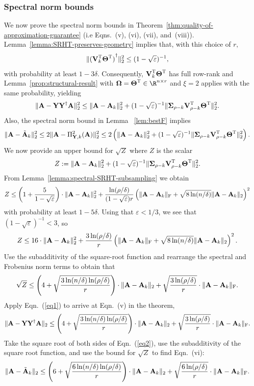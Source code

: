 \subsubsection{Spectral norm bounds}
We now prove the spectral norm bounds in Theorem~\ref{thm:quality-of-approximation-guarantee}  (i.e Eqns.~(v), (vi), (vii), and~(viii)).
Lemma~\ref{lemma:SRHT-preserves-geometry} implies that, with this choice of $r,$
$$
  \mbox{}\| {( {\bm{\mathrm{V}}}_k ^{\textsc{T}} {\bm{\mathrm{\Theta}}} ^{\textsc{T}})}^\dagger \|_2^2 \leq (1 - \sqrt{\varepsilon})^{-1},
$$
with probability at least $1 - 3\delta.$ Consequently, ${\bm{\mathrm{V}}}_k ^{\textsc{T}} {\bm{\mathrm{\Theta}}} ^{\textsc{T}}$ has full row-rank and Lemma~\ref{prop:structural-result}
 with $\matOmega = \matTh\transp \in \R^{n \times r}$ and  $\xi=2$ applies with the same probability, yielding
\begin{equation}\label{eq1}
 \TNormS{\matA - \matY \pinv{\matY} \matA } \leq \TNormS{\matA - \matA_k} + (1-\sqrt{\varepsilon})^{-1} \TNormS{\matSig_{\rho-k} \matV_{\rho-k} \transp \matTh \transp}.
\end{equation}
Also, the spectral norm bound in Lemma ~\ref{lem:bestF} implies
\begin{equation}\label{eq2}
 \TNormS{\matA - \tilde{\matA}_k } \leq 2 \TNormS{\matA - \Pi_{\matY,k}^{\mathrm{2}}(\matA) }  \leq 2 \left( \TNormS{\matA - \matA_k} + (1-\sqrt{\varepsilon})^{-1} \TNormS{\matSig_{\rho-k} \matV_{\rho-k} \transp \matTh \transp} \right).
\end{equation}
We now provide an upper bound for $\sqrt{Z}$ where $Z$ is the scalar
$$Z := \mbox{}\|{\bm{\mathrm{A}}} - {\bm{\mathrm{A}}}_k\|_2^2 + (1-\sqrt{\varepsilon})^{-1} \mbox{}\|{\bm{\mathrm{\Sigma}}}_{\rho-k} {\bm{\mathrm{V}}}_{\rho-k} ^{\textsc{T}} {\bm{\mathrm{\Theta}}} ^{\textsc{T}}\|_2^2.$$
From Lemma~\ref{lemma:spectral-SRHT-subsampling} we obtain
\[
Z \leq \left(1 + {5\over 1-\sqrt{\varepsilon}}\right) \cdot \mbox{}\|{\bm{\mathrm{A}}} - {\bm{\mathrm{A}}}_k\|_2^2 + { \ln (\rho/\delta)\over (1-\sqrt{\varepsilon}) r} \left( \mbox{}\|{\bm{\mathrm{A}}} - {\bm{\mathrm{A}}}_k\|_\mathrm{F} + \sqrt{8 \ln(n/\delta)} \mbox{}\|{\bm{\mathrm{A}}} - {\bm{\mathrm{A}}}_k\|_2 \right)^2
\]
with probability at least $1 - 5\delta.$ Using that $\varepsilon < 1/3$, we see that $(1-\sqrt{\varepsilon})^{-1} < 3$, so
\[
Z \leq 16 \cdot \mbox{}\|{\bm{\mathrm{A}}} - {\bm{\mathrm{A}}}_k\|_2^2 + { 3 \ln (\rho/\delta)\over r} \left( \mbox{}\|{\bm{\mathrm{A}}} - {\bm{\mathrm{A}}}_k\|_\mathrm{F} + \sqrt{8 \ln(n/\delta)} \mbox{}\|{\bm{\mathrm{A}}} - {\bm{\mathrm{A}}}_k\|_2 \right)^2.
\]
Use the subadditivity of the square-root function and rearrange the spectral and Frobenius norm terms to obtain that
\[
 \sqrt{Z} \leq \left(4 +
 \sqrt{{3 \ln(n/\delta)\ln(\rho/\delta)\over r}} \right) \cdot \mbox{}\|{\bm{\mathrm{A}}} - {\bm{\mathrm{A}}}_k\|_2 +
 \sqrt{{3 \ln(\rho/\delta)\over r}} \cdot \mbox{}\|{\bm{\mathrm{A}}} - {\bm{\mathrm{A}}}_k\|_\mathrm{F}.
 \]
Apply Eqn.~(\ref{eq1}) to arrive at Eqn.~(v) in the theorem,
\[
 \mbox{}\|{\bm{\mathrm{A}}} - {\bm{\mathrm{Y}}} {{\bm{\mathrm{Y}}}}^\dagger {\ensuremath{\bm{\mathrm{A}}}}\|_2 \leq \left(4 +
 \sqrt{{3 \ln(n/\delta)\ln(\rho/\delta)\over r}} \right) \cdot \mbox{}\|{\bm{\mathrm{A}}} - {\bm{\mathrm{A}}}_k\|_2 +
 \sqrt{{3 \ln(\rho/\delta)\over r}} \cdot \mbox{}\|{\bm{\mathrm{A}}} - {\bm{\mathrm{A}}}_k\|_\mathrm{F}.
\]
Take the square root of both sides of Eqn.~(\ref{eq2}), use the subadditivity of the square root function, and use the bound for $\sqrt{Z}$ to find Eqn.~(vi):
\[
 \mbox{}\|{\bm{\mathrm{A}}} - \tilde{{\bm{\mathrm{A}}}}_k\|_2 \leq \left(6 +
 \sqrt{{6 \ln(n/\delta)\ln(\rho/\delta)\over r}} \right) \cdot \mbox{}\|{\bm{\mathrm{A}}} - {\bm{\mathrm{A}}}_k\|_2 +
 \sqrt{{6 \ln(\rho/\delta)\over r}} \cdot \mbox{}\|{\bm{\mathrm{A}}} - {\bm{\mathrm{A}}}_k\|_\mathrm{F}.
\]


